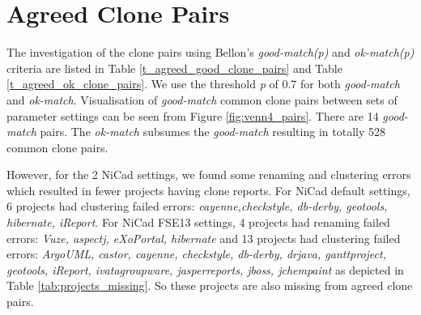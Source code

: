 \documentclass{IEEEtran}
\begin{document}
\section*{Agreed Clone Pairs}
The investigation of the clone pairs using Bellon's \textit{good-match(p)} and \textit{ok-match(p)} criteria are listed in  Table \ref{t_agreed_good_clone_pairs} and Table \ref{t_agreed_ok_clone_pairs}. We use the threshold \textit{p} of 0.7 for both \textit{good-match} and \textit{ok-match}. Visualisation of \textit{good-match} common clone pairs between sets of parameter settings can be seen from Figure \ref{fig:venn4_pairs}. There are 14 \textit{good-match} pairs. The \textit{ok-match} subsumes the \textit{good-match} resulting in totally 528 common clone pairs.

However, for the 2 NiCad settings, we found some renaming and clustering errors which resulted in fewer projects having clone reports. For NiCad default settings, 6 projects had clustering failed errors: \textit{cayenne,checkstyle, db-derby, geotools, hibernate, iReport}. For NiCad FSE13 settings, 4 projects had renaming failed errors: \textit{Vuze, aspectj, eXoPortal, hibernate} and 13 projects had clustering failed errors: \textit{ArgoUML, castor, cayenne, checkstyle, db-derby, drjava, ganttproject, geotools, iReport, ivatagroupware, jasperreports, jboss, jchempaint} as depicted in Table \ref{tab:projects_missing}. So these projects are also missing from agreed clone pairs.
\end{document}
